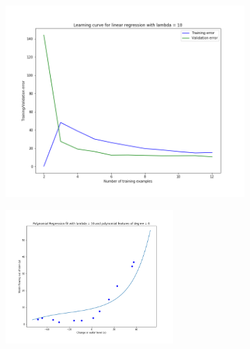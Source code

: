 \documentclass[english,11pt]{article}
\begin{document}
\begin{figure}[H]
\centering
\begin{subfigure}{.5\textwidth}
\centering
\includegraphics[width=.7\linewidth]{../hw1/part2/fig3_2_A4_learning_curve_lambda_10.png}
\end{subfigure}%
\begin{subfigure}{.5\textwidth}
\centering
\includegraphics[width=0.7\textwidth]{../hw1/part2/fig3_2_A4_polynomial_fit_lambda_10.png}
\end{subfigure}


\end{figure}
\end{document}
